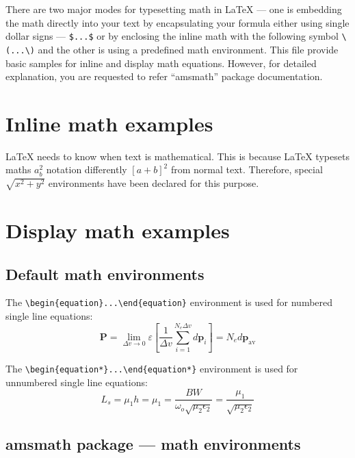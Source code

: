 \documentclass[numbers,webpdf,imaiai]{ima-authoring-template}%
\theoremstyle{thmstyleone}%
\theoremstyle{thmstyletwo}%
\theoremstyle{thmstylethree}%
\numberwithin{equation}{section}
\begin{document}
There are two major modes for typesetting math in LaTeX --- one is embedding the math directly into your text by encapsulating
your formula either using single dollar signs --- \verb+$...$+ or by enclosing the inline math with the following symbol
\verb+\(...\)+ and the other is using a predefined math environment. This file provide basic samples for inline and display
math equations. However, for detailed explanation, you are requested to refer ``amsmath'' package documentation.

\section{Inline math examples}

LaTeX needs to know when text is mathematical. This is because LaTeX typesets maths $a^{2}_{b}$ notation differently
\([a+b]^{2}\) from normal text. Therefore, special \(\sqrt{x^{2}+y^{2}}\) environments have been declared for this purpose.



\section{Display math examples}

\subsection{Default math environments}

The \verb+\begin{equation}...\end{equation}+ environment is used for numbered single line equations:
\begin{equation}
\mathbf{P} = \lim_{\Delta v\to 0} \varepsilon
\left[\frac{1}{\Delta v}\sum_{i=1}^{N_{e}\Delta v}d\mathbf{p}_{i}\right] =
N_{e}d\mathbf{p}_{\mathrm{av}}
\end{equation}

The \verb+\begin{equation*}...\end{equation*}+ environment is used for unnumbered single line equations:
\begin{equation*}
L_s=\mu_1h=\mu_1=\frac{BW}{\omega_o\sqrt{\mu_2\epsilon_2}}=\frac{\mu_1}{\sqrt{\mu_2\epsilon_2}}
\end{equation*}

\subsection{amsmath package --- math environments}
\end{document}
